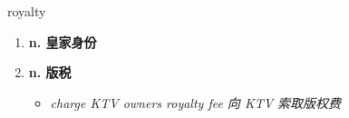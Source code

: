 
\begin{frame}
{\huge royalty}
\begin{center}
\begin{enumerate}\Large
  \item \textbf{n. 皇家身份}
  \item \textbf{n. 版税}
  \begin{itemize}
    \item \em{\Large{charge KTV owners royalty fee 向 KTV 索取版权费}}
  \end{itemize}
\end{enumerate}
\end{center}
\end{frame}
